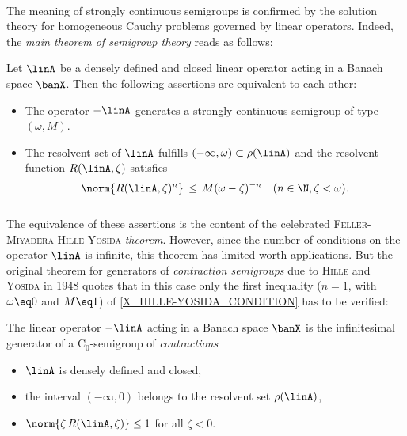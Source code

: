 \documentclass[11pt,twoside]{article}
\begin{document}
\paragraph{} %
The meaning of strongly continuous semigroups is confirmed
by the solution theory for homogeneous Cauchy problems
governed by linear operators.
Indeed,
the \textit{main theorem of semigroup theory} reads as follows:

\begin{theorem1}\label{MAIN_THEOREM_OF_SEMIGROUP_THEORY}
Let $\linA$ be a densely defined and closed linear operator
acting in a Banach space $\banX$.
Then the following assertions are equivalent to each other:

\begin{itemize}[leftmargin=15pt]
\item[(a)]
The operator $-\linA$ generates a strongly continuous semigroup
of type $(\omega,M)$.
\item[(b)]
The resolvent set of $\linA$ fulfills $(-\infty,\omega) \subset \rho(\linA)$
and the resolvent function $R(\linA,\zeta)$ satisfies
\begin{equation}\label{X_HILLE-YOSIDA_CONDITION}
\norm{R(\linA,\zeta)^n}
\, \leq \, M (\omega - \zeta)^{-n} \quad (n \in \N, \zeta < \omega).
\end{equation}
\end{itemize}
\end{theorem1}

\subparagraph{}
The equivalence of these assertions is the content
of the celebrated \textsc{Feller-Miyadera-Hille-Yosida} \textit{theorem}.
However,
since the number of conditions on the operator $\linA$ is infinite,
this theorem has limited worth {\wrt} applications.
But the original theorem for generators of \textit{contraction semigroups}
due to \textsc{Hille} and \textsc{Yosida} in 1948 quotes
that in this case only the first inequality
($n=1$, with $\omega \eq 0$ and $M \eq 1$)
of \eqref{X_HILLE-YOSIDA_CONDITION} has to be verified:

\begin{theorem1}\label{HILLE-YOSIDA_THEOREM}
The linear operator $-\linA$ acting in a Banach space $\banX$
is the infinitesimal generator of a C$_0$-semigroup of \textit{contractions}
\iff

\begin{itemize}[leftmargin=12pt]
\item[(a)]
$\linA$ is densely defined and closed,
\item[(b)]
the interval $(-\infty,0)$ belongs to the resolvent set $\rho(\linA)$,
\item[(c)]
$\norm{\zeta \, R(\linA,\zeta) } \leq 1$ for all $\zeta < 0$.
\end{itemize}
\end{theorem1}
\end{document}
